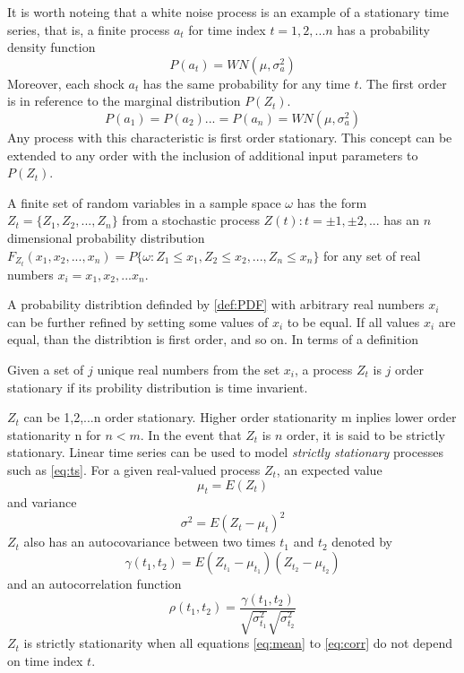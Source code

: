 It is worth noteing that a white noise process is an example of a stationary time series, that is, a finite process $a_t$ for time index $t=1,2,...n$ has a probability density function
\begin{equation}\label{eq:WN}
P(a_t) = WN(\mu, \sigma^2_a)
\end{equation}
Moreover, each shock $a_t$ has the same probability for any time $t$. The first order is in reference to the marginal distribution $P(Z_t)$.
\begin{equation}
P(a_1) = P(a_2) ... = P(a_n) = WN(\mu, \sigma^2_a)
\end{equation}
Any process with this characteristic is first order stationary. This concept can be extended to any order with the inclusion of additional input parameters to $P(Z_t)$.
\begin{definition} \label{def:PDF}
A finite set of random variables in a sample space $\omega$ has the form $Z_t = \{ Z_1, Z_2, ... , Z_n \}$ from a stochastic process ${Z(t): t = \pm 1, \pm 2, ...}$ has an $n$ dimensional probability distribution $F_{Z_t}(x_1, x_2, ..., x_n) = P\{\omega:Z_1 \leq x_1,  Z_2 \leq x_2, ..., Z_n \leq x_n\}$ for any set of real numbers $x_i = {x_1, x_2, ...x_n}$.
\end{definition}
A probability distribtion definded by \ref{def:PDF} with arbitrary real numbers $x_i$ can be further refined by setting some values of $x_i$ to be equal. If all values $x_i$ are equal, than the distribtion is first order, and so on. In terms of a definition
\begin{definition} \label{def:nOrder}
Given a set of $j$ unique real numbers from the set $x_i$, a process $Z_t$ is $j$ order stationary if its probility distribution is time invarient.
\end{definition}
$Z_t$ can be 1,2,...n order stationary. Higher order stationarity m inplies lower order stationarity n for $n < m$. In the event that $Z_t$ is $n$ order, it is said to be strictly stationary.
Linear time series can be used to model \textit{strictly stationary} processes such as \ref{eq:ts}.
For a given real-valued process $Z_t$, an expected value 
\begin{equation}\label{eq:mean}
\mu_t = E(Z_t)
\end{equation}
and variance 
\begin{equation}\label{eq:std}
\sigma^2 = E(Z_t - \mu_t)^2
\end{equation}
$Z_t$ also has an autocovariance between two times $t_1$ and $t_2$ denoted by 
\begin{equation}\label{eq:cov}
\gamma(t_1, t_2) = E(Z_{t_1} - \mu_{t_1})(Z_{t_2} - \mu_{t_2})
\end{equation}
and an autocorrelation function 
\begin{equation}\label{eq:corr}
\rho(t_1, t_2) = \frac{\gamma(t_1, t_2)}{\sqrt{\sigma_{t_1}^2}\sqrt{\sigma_{t_2}^2}}
\end{equation}
$Z_t$ is strictly stationarity when all equations \ref{eq:mean} to \ref{eq:corr} do not depend on time index $t$. 

